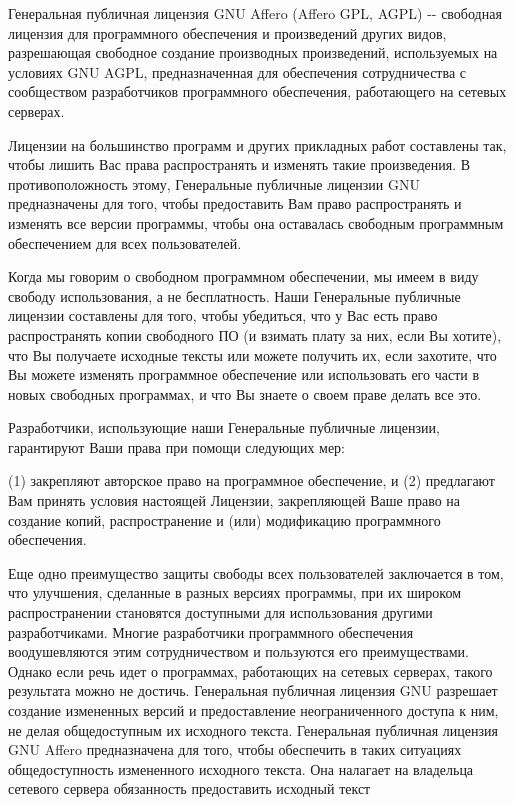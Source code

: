 Генеральная публичная лицензия GNU Affero (Affero GPL, AGPL) -\/-\/ свободная лицензия для программного обеспечения и произведений других видов, разрешающая свободное создание производных произведений, используемых на условиях GNU AGPL, предназначенная для обеспечения сотрудничества с сообществом разработчиков программного обеспечения, работающего на сетевых серверах.

Лицензии на большинство программ и других прикладных работ составлены так, чтобы лишить Вас права распространять и изменять такие произведения. В противоположность этому, Генеральные публичные лицензии GNU предназначены для того, чтобы предоставить Вам право распространять и изменять все версии программы, чтобы она оставалась свободным программным обеспечением для всех пользователей.

Когда мы говорим о свободном программном обеспечении, мы имеем в виду свободу использования, а не бесплатность. Наши Генеральные публичные лицензии составлены для того, чтобы убедиться, что у Вас есть право распространять копии свободного ПО (и взимать плату за них, если Вы хотите), что Вы получаете исходные тексты или можете получить их, если захотите, что Вы можете изменять программное обеспечение или использовать его части в новых свободных программах, и что Вы знаете о своем праве делать все это.

Разработчики, использующие наши Генеральные публичные лицензии, гарантируют Ваши права при помощи следующих мер\+:

(1) закрепляют авторское право на программное обеспечение, и (2) предлагают Вам принять условия настоящей Лицензии, закрепляющей Ваше право на создание копий, распространение и (или) модификацию программного обеспечения.

Еще одно преимущество защиты свободы всех пользователей заключается в том, что улучшения, сделанные в разных версиях программы, при их широком распространении становятся доступными для использования другими разработчиками. Многие разработчики программного обеспечения воодушевляются этим сотрудничеством и пользуются его преимуществами. Однако если речь идет о программах, работающих на сетевых серверах, такого результата можно не достичь. Генеральная публичная лицензия GNU разрешает создание измененных версий и предоставление неограниченного доступа к ним, не делая общедоступным их исходного текста. Генеральная публичная лицензия GNU Affero предназначена для того, чтобы обеспечить в таких ситуациях общедоступность измененного исходного текста. Она налагает на владельца сетевого сервера обязанность предоставить исходный текст

